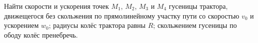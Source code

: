 Найти скорости и ускорения точек $M_1$, $M_2$, $M_3$ и $M_4$
гусеницы трактора, движещегося без скольжения
по прямолинейному участку пути со скоростью $v_0$ и ускорением $w_0$;
радиусы колёс трактора равны $R$;
скольжением гусеницы по ободу колёс пренебречь.
